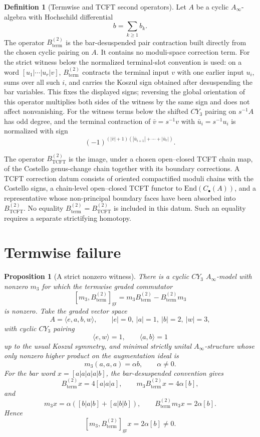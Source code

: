 \documentclass[11pt]{amsart}
\providecommand{\Ainf}{A_\infty}
\providecommand{\TCFT}{\mathrm{TCFT}}
\newtheorem{proposition}[theorem]{Proposition}
\theoremstyle{definition}
\newtheorem{definition}[theorem]{Definition}
\theoremstyle{remark}
\begin{document}
\begin{definition}[Termwise and TCFT second operators]
Let \(A\) be a cyclic \(\Ainf\)-algebra with Hochschild differential
\[
        b=\sum_{k\geq 1} b_k .
\]
The operator \(B^{(2)}_{\mathrm{term}}\) is the bar-desuspended pair
contraction built directly from the chosen cyclic pairing on \(A\).  It
contains no moduli-space correction term.
For the strict witness below the normalized terminal-slot convention is
used: on a word \([u_1|\cdots|u_r|v]\), \(B^{(2)}_{\mathrm{term}}\)
contracts the terminal input \(v\) with one earlier input \(u_i\), sums over
all such \(i\), and carries the Koszul sign obtained after desuspending the
bar variables.  This fixes the displayed signs; reversing the global
orientation of this operator multiplies both sides of the witness by the
same sign and does not affect nonvanishing.
For the witness terms below the shifted \(CY_3\) pairing on \(s^{-1}A\) has
odd degree, and the terminal contraction of \(\bar v=s^{-1}v\) with
\(\bar u_i=s^{-1}u_i\) is normalized with sign
\[
        (-1)^{(|\bar v|+1)(|\bar u_{i+1}|+\cdots+|\bar u_r|)} .
\]

The operator \(B^{(2)}_{\TCFT}\) is the image, under a chosen open--closed
TCFT chain map, of the Costello genus-change chain together with its
boundary corrections.  A TCFT correction datum consists of oriented
compactified moduli chains with the Costello signs, a chain-level
open--closed TCFT functor to \(\mathrm{End}(C_\bullet(A))\), and a
representative whose non-principal boundary faces have been absorbed into
\(B^{(2)}_{\TCFT}\).
No equality \(B^{(2)}_{\mathrm{term}}=B^{(2)}_{\TCFT}\) is included in this
datum.  Such an equality requires a separate strictifying homotopy.
\end{definition}

\section{Termwise failure}

\begin{proposition}[A strict nonzero witness]
There is a cyclic \(CY_3\) \(\Ainf\)-model with nonzero \(m_3\) for which the
termwise graded commutator
\[
        [m_3,B^{(2)}_{\mathrm{term}}]_{\mathrm{gr}}
        =
        m_3B^{(2)}_{\mathrm{term}}-B^{(2)}_{\mathrm{term}}m_3
\]
is nonzero.  Take the graded vector space
\[
        A=\langle e,a,b,w\rangle,\qquad |e|=0,\ |a|=1,\ |b|=2,\ |w|=3,
\]
with cyclic \(CY_3\) pairing
\[
        \langle e,w\rangle=1,\qquad \langle a,b\rangle=1
\]
up to the usual Koszul symmetry, and minimal strictly unital
\(\Ainf\)-structure whose only nonzero higher product on the augmentation
ideal is
\[
        m_3(a,a,a)=\alpha b,\qquad \alpha\neq0 .
\]
For the bar word \(x=[a|a|a|a|b]\), the bar-desuspended convention gives
\[
        B^{(2)}_{\mathrm{term}}x=4[a|a|a],\qquad
        m_3B^{(2)}_{\mathrm{term}}x=4\alpha[b],
\]
and
\[
        m_3x=\alpha([b|a|b]+[a|b|b]),\qquad
        B^{(2)}_{\mathrm{term}}m_3x=2\alpha[b].
\]
Hence
\[
        [m_3,B^{(2)}_{\mathrm{term}}]_{\mathrm{gr}}x
        =
        2\alpha[b]\neq0 .
\]
\end{proposition}
\end{document}
